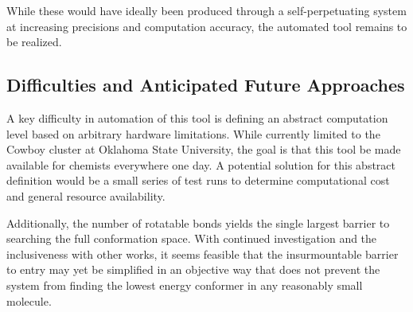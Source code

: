 While these would have ideally been produced through a self-perpetuating system at increasing precisions and computation accuracy, the automated tool remains to be realized.

\subsection{Difficulties and Anticipated Future Approaches}

A key difficulty in automation of this tool is defining an abstract computation level based on arbitrary hardware limitations.
While currently limited to the Cowboy cluster at Oklahoma State University, the goal is that this tool be made available for chemists everywhere one day.
A potential solution for this abstract definition would be a small series of test runs to determine computational cost and general resource availability.

Additionally, the number of rotatable bonds yields the single largest barrier to searching the full conformation space.
With continued investigation and the inclusiveness with other works, it seems feasible that the insurmountable barrier to entry may yet be simplified in an objective way that does not prevent the system from finding the lowest energy conformer in any reasonably small molecule.
